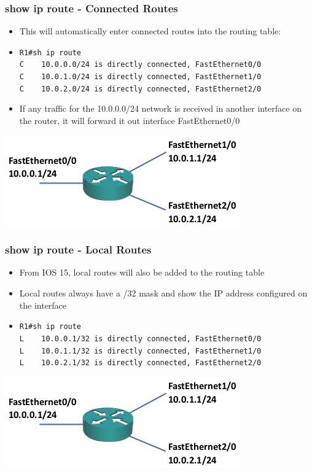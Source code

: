 \documentclass[pdflatex,compress,mathserif]{beamer}
\begin{document}
\begin{frame}
	\frametitle{show ip route - Connected Routes}
	\begin{itemize}
		\item This will automatically enter connected routes into the routing table:
		\item[] \texttt{\footnotesize R1\#sh ip route\\
			C $ \quad $ 10.0.0.0/24 is directly connected, FastEthernet0/0 \\
			C $ \quad $ 10.0.1.0/24 is directly connected, FastEthernet1/0 \\
			C $ \quad $ 10.0.2.0/24 is directly connected, FastEthernet2/0}
		\item If any traffic for the 10.0.0.0/24 network is received in another interface on the router, it will forward it out interface FastEthernet0/0
	\end{itemize}
	\begin{center}
		\includegraphics[width=0.5\linewidth]{img/img01}
	\end{center}
\end{frame}

\begin{frame}
	\frametitle{show ip route - Local Routes}
	\begin{itemize}
		\item From IOS 15, local routes will also be added to the routing table
		\item Local routes always have a /32 mask and show the IP address configured on the
		interface
		\item[] \texttt{\footnotesize R1\#sh ip route\\
			L $ \quad $ 10.0.0.1/32 is directly connected, FastEthernet0/0\\
			L $ \quad $ 10.0.1.1/32 is directly connected, FastEthernet1/0\\
			L $ \quad $ 10.0.2.1/32 is directly connected, FastEthernet2/0}
	\end{itemize}
	\begin{center}
		\includegraphics[width=0.5\linewidth]{img/img01}
	\end{center}
\end{frame}
\end{document}

